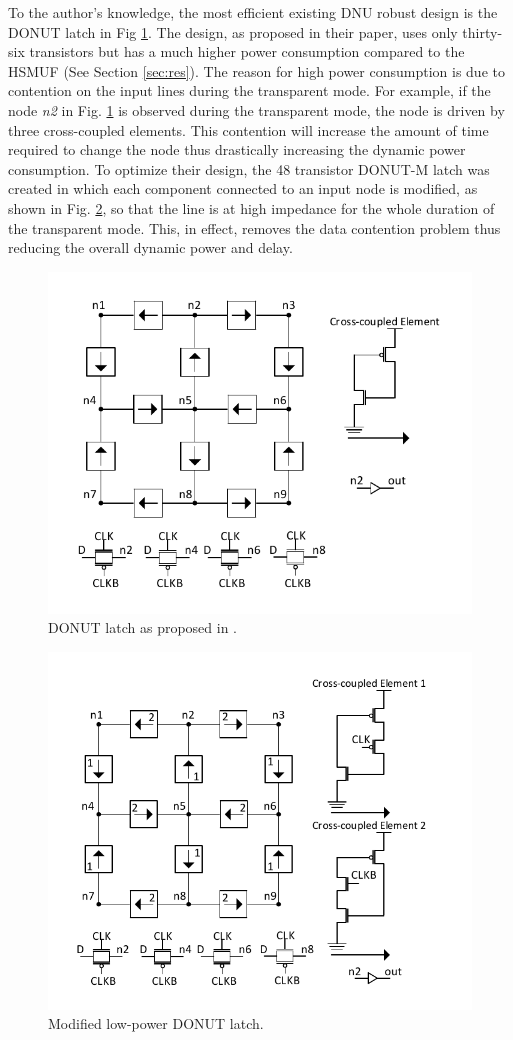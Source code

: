 To the author's knowledge, the most efficient existing DNU robust design is the DONUT latch \cite{DONUT} in Fig \ref{fig:DONUT}. The design, as proposed in their paper, uses only thirty-six transistors but has a much higher power consumption compared to the HSMUF (See Section \ref{sec:res}). The reason for high power consumption is due to contention on the input lines during the transparent mode. For example, if the node \textit{n2} in Fig. \ref{fig:DONUT} is observed during the transparent mode, the node is driven by three cross-coupled elements. This contention will increase the amount of time required to change the node thus drastically increasing the dynamic power consumption. To optimize their design, the 48 transistor DONUT-M latch was created in which each component connected to an input node is modified, as shown in Fig. \ref{DONUT_M}, so that the line is at high impedance for the whole duration of the transparent mode. This, in effect, removes the data contention problem thus reducing the overall dynamic power and delay.  

\begin{figure}[htbp]
	\centering
	\includegraphics[width=0.65\linewidth]{Figures/DONUT}
	\caption{DONUT latch as proposed in \cite{DONUT}.}
	\label{fig:DONUT}
\end{figure}

\begin{figure}[htbp]
	\centering
	\includegraphics[width=0.65\linewidth]{Figures/ModDONUT}
	\caption{Modified low-power DONUT latch.}
	\label{DONUT_M}
\end{figure}


